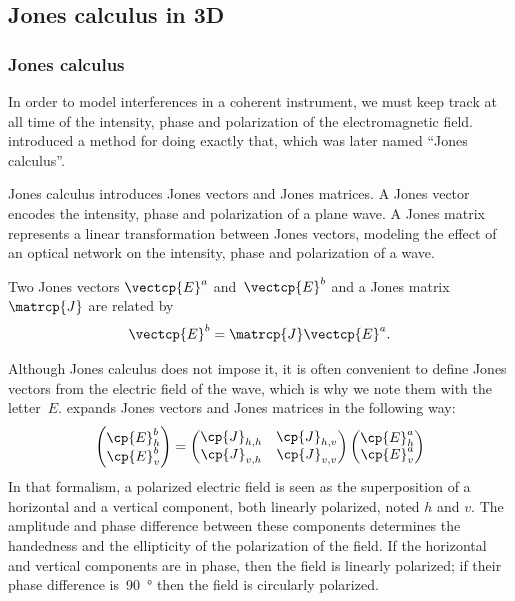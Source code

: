 \begin{refsection}

\subsection{Jones calculus in 3D}



\subsubsection{Jones calculus}

In order to model interferences in a coherent instrument, we must keep track at all time of the intensity, phase and polarization of the electromagnetic field.
\textcite{jones1941calculus} introduced a method for doing exactly that,
which was later named ``Jones calculus''.

Jones calculus introduces Jones vectors and Jones matrices.
A Jones vector encodes the intensity, phase and polarization of a plane wave.
A Jones matrix represents a linear transformation between Jones vectors, modeling the effect of an optical network on the intensity, phase and polarization of a wave.

Two Jones vectors $\vectcp{E}^a$ and~$\vectcp{E}^b$ and a Jones matrix~$\matrcp{J}$ are related by
\begin{equation}
    \vectcp{E}^b = \matrcp{J} \vectcp{E}^a
    \label{eq:jones_matrix_short}
    \text{.}
\end{equation}

Although Jones calculus does not impose it, it is often convenient to define Jones vectors from the electric field of the wave, which is why we note them with the letter~$E$.
\Textcite{hecht2002optics} expands Jones vectors and Jones matrices in the following way:
\begin{equation}
    \begin{pmatrix}
        \cp{E}^b_h\\
        \cp{E}^b_v
    \end{pmatrix}
    =
    \begin{pmatrix}
        \cp{J}_{h, h}   &   \cp{J}_{h, v} \\
        \cp{J}_{v, h}   &   \cp{J}_{v, v}
    \end{pmatrix}
    \begin{pmatrix}
        \cp{E}^a_h\\
        \cp{E}^a_v
    \end{pmatrix}
    \label{eq:jones_matrix_2d}
\end{equation}
In that formalism,
a polarized electric field is seen as the superposition of a horizontal and a vertical component, both linearly polarized, noted $h$ and $v$.
The amplitude and phase difference between these components determines the handedness and the ellipticity of the polarization of the field.
If the horizontal and vertical components are in phase, then the field is linearly polarized; if their phase difference is~\SI{90}{\degree} then the field is circularly polarized.


\end{refsection}
